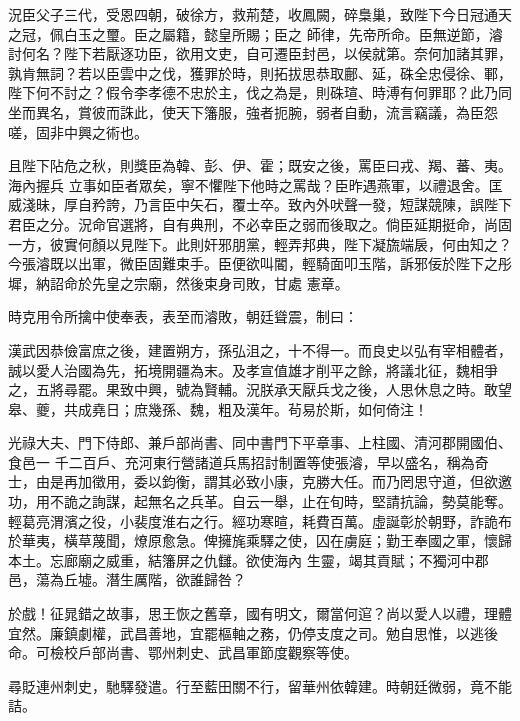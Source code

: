 \begin{pinyinscope}
 況臣父子三代，受恩四朝，破徐方，救荊楚，收鳳闕，碎梟巢，致陛下今日冠通天之冠，佩白玉之璽。臣之屬籍，懿皇所賜；臣之
 師律，先帝所命。臣無逆節，濬討何名？陛下若厭逐功臣，欲用文吏，自可遷臣封邑，以侯就第。奈何加諸其罪，孰肯無詞？若以臣雲中之伐，獲罪於時，則拓拔思恭取鄜、延，硃全忠侵徐、鄆，陛下何不討之？假令李孝德不忠於主，伐之為是，則硃瑄、時溥有何罪耶？此乃同坐而異名，賞彼而誅此，使天下籓服，強者扼腕，弱者自動，流言竊議，為臣怨嗟，固非中興之術也。



 且陛下阽危之秋，則獎臣為韓、彭、伊、霍；既安之後，罵臣曰戎、羯、蕃、夷。海內握兵
 立事如臣者眾矣，寧不懼陛下他時之罵哉？臣昨遇燕軍，以禮退舍。匡威淺昧，厚自矜誇，乃言臣中矢石，覆士卒。致內外吠聲一發，短謀競陳，誤陛下君臣之分。況命官選將，自有典刑，不必幸臣之弱而後取之。倘臣延期挺命，尚固一方，彼實何顏以見陛下。此則奸邪朋黨，輕弄邦典，陛下凝旒端扆，何由知之？今張濬既以出軍，微臣固難束手。臣便欲叫閽，輕騎面叩玉階，訴邪佞於陛下之彤墀，納詔命於先皇之宗廟，然後束身司敗，甘處
 憲章。



 時克用令所擒中使奉表，表至而濬敗，朝廷聳震，制曰：



 漢武因恭儉富庶之後，建置朔方，孫弘沮之，十不得一。而良史以弘有宰相體者，誠以愛人治國為先，拓境開疆為末。及孝宣值雄才削平之餘，將議北征，魏相爭之，五將尋罷。果致中興，號為賢輔。況朕承天厭兵戈之後，人思休息之時。敢望皋、夔，共成堯日；庶幾孫、魏，粗及漢年。茍易於斯，如何倚注！



 光祿大夫、門下侍郎、兼戶部尚書、同中書門下平章事、上柱國、清河郡開國伯、食邑一
 千二百戶、充河東行營諸道兵馬招討制置等使張濬，早以盛名，稱為奇士，由是再加徵用，委以鈞衡，謂其必致小康，克勝大任。而乃罔思守道，但欲邀功，用不詭之詢謀，起無名之兵革。自云一舉，止在旬時，堅請抗論，勢莫能奪。輕葛亮渭濱之役，小裴度淮右之行。經功寒暄，耗費百萬。虛誕彰於朝野，詐詭布於華夷，橫草蔑聞，燎原愈急。俾擁旄乘驛之使，囚在虜庭；勤王奉國之軍，懷歸本土。忘廊廟之威重，結籓屏之仇讎。欲使海內
 生靈，竭其貢賦；不獨河中郡邑，蕩為丘墟。潛生厲階，欲誰歸咎？



 於戲！征晁錯之故事，思王恢之舊章，國有明文，爾當何逭？尚以愛人以禮，理體宜然。廉鎮劇權，武昌善地，宜罷樞軸之務，仍停支度之司。勉自思惟，以逃後命。可檢校戶部尚書、鄂州刺史、武昌軍節度觀察等使。



 尋貶連州刺史，馳驛發遣。行至藍田關不行，留華州依韓建。時朝廷微弱，竟不能詰。




\end{pinyinscope}
